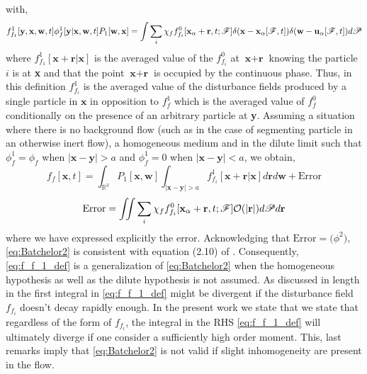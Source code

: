 with, 
\begin{equation*}
    f_{f_1}^1[\textbf{y},\textbf{x},\textbf{w},t] \phi_f^1 [\textbf{y}|\textbf{x},\textbf{w},t] P_1[\textbf{w},\textbf{x}]
    = 
    \int{
    \sum_i
    \chi_f f_{f_i}^0[\textbf{x}_\alpha + \textbf{r},t;\mathscr{F}] 
    \delta(\textbf{x} - \textbf{x}_\alpha[\mathscr{F},t])
    \delta(\textbf{w} - \textbf{u}_\alpha[\mathscr{F},t])
    }d\mathscr{P}
\end{equation*}
where $f_{f_1}^1[\textbf{x}+ \textbf{r}| \textbf{x}]$ is the averaged value of the $f_{f_i}^0$ at $\textbf{x}+\textbf{r}$ knowing the particle $i$ is at \textbf{x} and that the point $\textbf{x}+\textbf{r}$ is occupied by the continuous phase. 
Thus, in this definition $f_{f_i}^1$ is the averaged value of the disturbance fields produced by a single particle in $\textbf{x}$ in opposition to $f_f^1$ which is the averaged value of $f_f^0$ conditionally on the presence of an arbitrary particle at \textbf{y}.
Assuming a situation where there is no background flow (such as in the case of segmenting particle in an otherwise inert flow), a homogeneous medium and in the dilute limit such that $\phi_f^1 = \phi_f$ when $|\textbf{x}-\textbf{y}|>a$ and $\phi_f^1 =0$ when $|\textbf{x}-\textbf{y}|<a$, we obtain, 
\begin{equation}
    f_f[\textbf{x},t]
    = 
    \int_{\mathbb{R}^3} 
    P_1[\textbf{x},\textbf{w}] 
    \int_{|\textbf{x}-\textbf{y}| >a} 
    f_{f_i}^1[\textbf{x}+ \textbf{r}| \textbf{x}]
    d\textbf{r}
    d\textbf{w}
    + 
    \text{Error}
    \label{eq:Batchelor2}
\end{equation}
\begin{equation}
    \text{Error}
    = 
    \iint{
    \sum_i
    \chi_f f_{f_i}^0[\textbf{x}_\alpha + \textbf{r},t;\mathscr{F}] 
    \mathcal{O}(|\textbf{r}|)
    }d\mathscr{P} d\textbf{r}
    \label{eq:error}
\end{equation}
where we have expressed explicitly the error. 
Acknowledging that $\text{Error}= \mathcal(\phi^2)$, \ref{eq:Batchelor2} is consistent with equation (2.10) of \citet{batchelor1972sedimentation}. 
Consequently, \ref{eq:f_f_1_def} is a generalization of \ref{eq:Batchelor2} when the homogeneous hypothesis as well as the dilute hypothesis is not assumed. 
As discussed in length in  \citet{batchelor1972sedimentation} the first integral in \ref{eq:f_f_1_def} might be divergent if the disturbance field $f_{f_i}$ doesn't decay rapidly enough. 
In the present work we state that we state that regardless of the form of $f_{f_i}$, the integral in the RHS \ref{eq:f_f_1_def} will ultimately diverge if one consider a sufficiently high order moment. 
This, last remarks imply that \ref{eq:Batchelor2} is not valid if slight inhomogeneity are present in the flow. 

